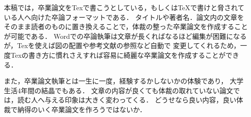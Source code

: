 


\begin{jabstract}

本稿では，卒業論文をTexで書こうとしている，もしくはTeXで書けと脅されている人へ向けた卒論フォーマットである．
タイトルや著者名．論文内の文章をそのまま読者のものに置き換えることで，体裁の整った卒業論文を作成することが可能である．
Wordでの卒論執筆は文章が長くればなるほど編集が困難になるが，Texを使えば図の配置や参考文献の参照など自動で
変更してくれるため，一度Texの書き方に慣れさえすれば容易に綺麗な卒業論文を作成することができる．

また，卒業論文執筆とは一生に一度，経験するかしないかの体験であり，
大学生活4年間の結晶でもある．
文章の内容が良くても体裁の取れていない論文では，読む人へ与える印象は大きく変わってくる．
どうせなら良い内容，良い体裁で納得のいく卒業論文を作ろうではないか．


\end{jabstract}

